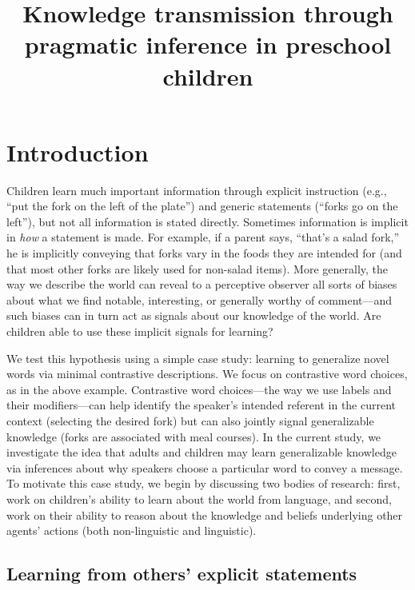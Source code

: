 \documentclass[man]{apa2}
\title{
Knowledge transmission through pragmatic inference in preschool children}
\begin{document}
\maketitle                            


\section{Introduction}

Children learn much important information through explicit instruction (e.g., ``put the fork on the left of the plate'') and generic statements (``forks go on the left''), but not all information is stated directly. Sometimes information is implicit in \emph{how} a statement is made. For example, if a parent says, ``that's a salad fork,'' he is implicitly conveying that forks vary in the foods they are intended for (and that most other forks are likely used for non-salad items). More generally, the way we describe the world can reveal to a perceptive observer all sorts of biases about what we find notable, interesting, or generally worthy of comment---and such biases can in turn act as signals about our knowledge of the world. Are children able to use these implicit signals for learning? 

We test this hypothesis using a simple case study: learning to generalize novel words via minimal contrastive descriptions.  We focus on contrastive word choices, as in the above example. Contrastive word choices---the way we use labels and their modifiers---can help identify the speaker's intended referent in the current context (selecting the desired fork) but can also jointly signal generalizable knowledge (forks are associated with meal courses). In the current study, we investigate the idea that adults and children may learn generalizable knowledge via inferences about why speakers choose a particular word to convey a message. To motivate this case study, we begin by discussing two bodies of research: first, work on children's ability to learn about the world from language, and second, work on their ability to reason about the knowledge and beliefs underlying other agents' actions (both non-linguistic and linguistic). 


\subsection{Learning from others' explicit statements}
\end{document}
